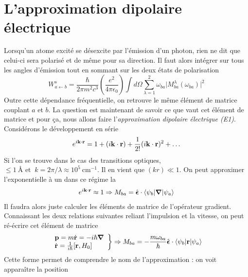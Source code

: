 \section{L'approximation dipolaire électrique}
Lorsqu'un atome excité se désexcite par l'émission d'un photon, rien ne dit que celui-ci sera
polarisé et de même pour sa direction. Il faut alors intégrer sur tous les angles d'émission tout
en sommant sur les deux états de polarisation
\begin{equation}
W_{a \leftarrow b}^s = \frac{\hbar}{ 2 \pi m^2 c^3} \left( \frac{e^2}{4 \pi \epsilon_0 } \right)
\int d\Omega \sum_{\lambda = 1}^2 \omega_{ba} \vert M^{\lambda}_{ba} (\omega_{ba}) \vert ^2
\end{equation}
Outre cette dépendance fréquentielle, on retrouve le même élément de matrice couplant $a$ et $b$. La
question est maintenant de savoir ce que vaut cet élément de matrice et pour ça, nous allons faire
l'\textit{approximation dipolaire électrique (E1)}. Considérons le développement en série
\begin{equation}
e^{i {\bf k} \cdot {\bf r} } = 1 + (i {\bf k} \cdot {\bf r} ) + \frac{1}{2!} 
  ( i {\bf k} \cdot {\bf r} ) ^2 + \ldots
\end{equation}
Si l'on se trouve dans le cas des transitions optiques, $ \leq  1~\mbox{\AA~et }~k = 2 \pi / \lambda
\approx 10^5~\mbox{cm}^{-1}$. Il en vient que $(kr)\ll 1$. On peut approximer l'exponentielle 
à un dans ce régime la
\begin{equation}
e^{i {\bf k} \cdot {\bf r} } \approx  1  \Rightarrow
M_{ba} = \hat{  \mbox{\boldmath $ \epsilon $}} \cdot \langle \psi_b \vert
\mbox{\boldmath $ \nabla $} \vert \psi_a \rangle
\end{equation}
Il faudra alors juste calculer les éléments de matrice de l'opérateur gradient. Connaissant les 
deux relations suivantes reliant l'impulsion et la vitesse, on peut ré-écrire cet élément de 
matrice
\begin{equation}
\left.
\begin{array}{l}
{\bf p} = m \dot{{\bf r}} = -i \hbar \mbox{\boldmath $ \nabla $} \\
\dot{{\bf r}}  = \frac{1}{i \hbar} [ {\bf r}, H_0 ] \end{array}
\right\} \Rightarrow
M_{ba} = - \frac{m \omega_{ba}}{\hbar} \hat{  \mbox{\boldmath $ \epsilon $}} \cdot 
\langle \psi_b \vert {\bf r} \vert \psi_a \rangle
\end{equation}
Cette forme permet de comprendre le nom de l'approximation : on voit apparaître la position 
